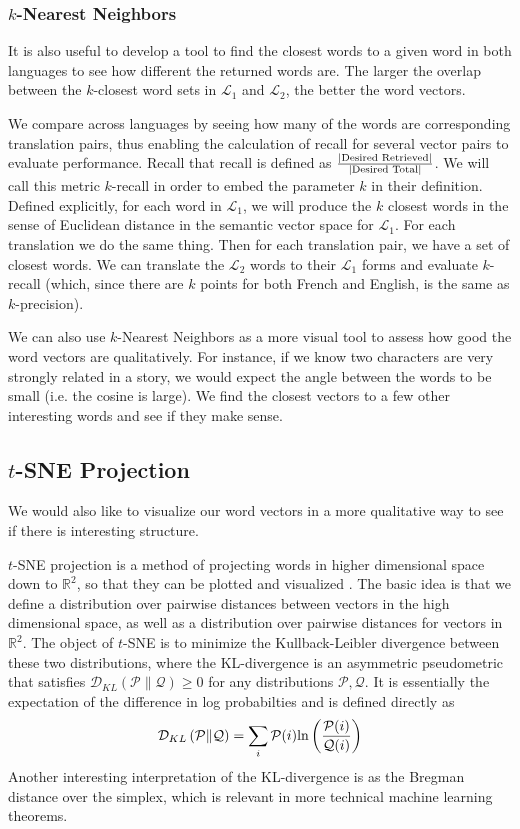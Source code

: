 \documentclass[12pt, usenames]{article}
\theoremstyle{definition}
\theoremstyle{definition}
\theoremstyle{definition}
\newcommand{\txt}[1]
{\textnormal{#1}}
\newcommand{\mc}[1]
{\mathcal{#1}}
\begin{document}
\subsubsection{$k$-Nearest Neighbors}
It is also useful to develop a tool to find the closest words to a given word in both languages to see how different the returned words are. The larger the overlap between the $k$-closest word sets in $\mc{L}_1$ and $\mc{L}_2$, the better the word vectors. 

We compare across languages by seeing how many of the words are corresponding
translation pairs, thus enabling the calculation of recall for several vector pairs to evaluate performance. Recall that recall is defined as $\frac{|\txt{Desired Retrieved}|}{|\txt{Desired Total}|}$. We will call this metric $k$-recall in order to embed the parameter $k$ in their definition. Defined explicitly, for each word in $\mc{L}_1$, we will produce the $k$ closest words in the sense of Euclidean distance in the semantic vector space for $\mc{L}_1$. For each translation we do the same thing. Then for each translation pair, we have a set of closest words. We can translate the $\mc{L}_2$ words to their $\mc{L}_1$ forms and evaluate $k$-recall (which, since there are $k$ points for both French and English, is the same as $k$-precision).

We can also use $k$-Nearest Neighbors as a more visual tool to assess how good the word vectors are qualitatively. For instance, if we know two characters are very strongly related in a story, we would expect the angle between the words to be small (i.e. the cosine is large). We find the closest vectors to a few other interesting words and see if they make sense. 


\subsection{$t$-SNE Projection}
We would also like to visualize our word vectors in a more qualitative way to see if there is interesting structure.

$t$-SNE projection is a method of projecting words in higher dimensional space down to $\mathbb{R}^2$, so that they can be plotted and visualized \cite{tSNE}. The basic idea is that we define a distribution over pairwise distances between vectors in the high dimensional space, as well as a distribution over pairwise distances for vectors in $\mathbb{R}^2$. The object of $t$-SNE is to minimize the Kullback-Leibler divergence between these two distributions, where the KL-divergence is an asymmetric pseudometric that satisfies $\mc{D}_{KL}\left(\mc{P} \| \mc{Q}\right) \geq 0$ for any distributions $\mc{P}, \mc{Q}$. It is essentially the expectation of the difference in log probabilties and is defined directly as 
\begin{align}
\label{KL-div}
\mc{D}_{KL}\left(\mc{P} \| \mc{Q}\right) = \sum_i \mc{P}(i)\txt{ln}\left(\frac{\mc{P}(i)}{\mc{Q}(i)}\right)
\end{align}
Another interesting interpretation of the KL-divergence is as the Bregman distance over the simplex, which is relevant in more technical machine learning theorems.
\end{document}
